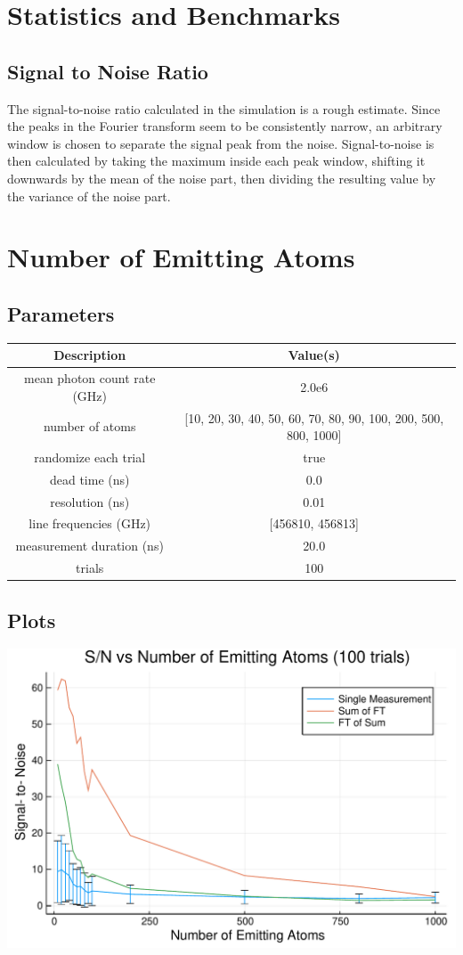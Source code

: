 \documentclass[12pt,a4paper]{article}
\begin{document}
\section{Statistics and Benchmarks}
\subsection{Signal to Noise Ratio}
The signal-to-noise ratio calculated in the simulation is a rough estimate. Since the peaks in the Fourier transform seem to be consistently narrow, an arbitrary window is chosen to separate the signal peak from the noise. Signal-to-noise is then calculated by taking the maximum inside each peak window, shifting it downwards by the mean of the noise part, then dividing the resulting value by the variance of the noise part.

\section{Number of Emitting Atoms}


\subsection{Parameters}
\begin{tabular}
{c | c}
Description & Value(s) \\
\hline
mean photon count rate (GHz) & 2.0e6 \\
number of atoms & [10, 20, 30, 40, 50, 60, 70, 80, 90, 100, 200, 500, 800, 1000] \\
randomize each trial & true \\
dead time (ns) & 0.0 \\
resolution (ns) & 0.01 \\
line frequencies (GHz) & [456810, 456813] \\
measurement duration (ns) & 20.0 \\
trials & 100 \\
\end{tabular}
\subsection{Plots}

\includegraphics[width=\linewidth]{jl_PKMVtA/simnb_3_1.pdf}
\end{document}
